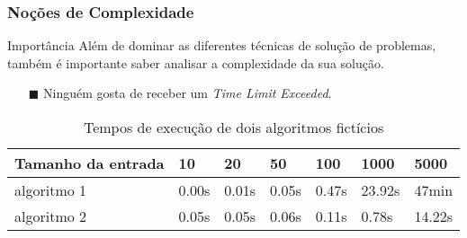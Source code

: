 
\begin{frame}
\frametitle{Noções de Complexidade}

\begin{block}{Importância}
Além de dominar as diferentes técnicas  de solução de problemas, também é importante saber analisar a complexidade da sua solução.
\begin{itemize}
	\item[$\blacksquare$] Ninguém gosta de receber um \emph{Time Limit Exceeded}.
\end{itemize}
\end{block}

\begin{block}{}
\begin{table}
    \begin{tabular}{|l|l|l|l|l|l|l|}
        \hline
        Tamanho da entrada  & 10    & 20    & 50    & 100   & 1000   & 5000	\\ \hline
        algoritmo 1         & 0.00s & 0.01s & 0.05s & 0.47s & 23.92s & 47min	\\ \hline
        algoritmo 2         & 0.05s & 0.05s & 0.06s & 0.11s & 0.78s  & 14.22s	\\  \hline
    \end{tabular}
    \caption{Tempos de execução de dois algoritmos fictícios}
\end{table}
\end{block}
\end{frame}

